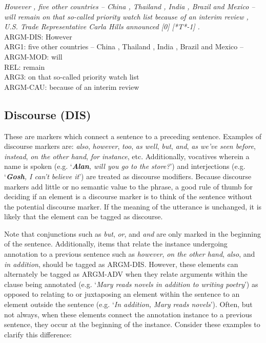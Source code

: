 \documentclass[11pt]{report}
\begin{document}
\textit{However , five other countries -- China , Thailand , India , Brazil and Mexico -- will remain on that so-called priority watch list because of an interim review , U.S. Trade Representative Carla Hills announced [0] [*T*-1] .}\\
ARGM-DIS:        However \\
ARG1:        five other countries -- China , Thailand , India , Brazil and Mexico -- \\
ARGM-MOD:        will \\
REL:        remain \\
ARG3:        on that so-called priority watch list \\
ARGM-CAU:        because of an interim review 

\subsection{Discourse (DIS)}
\label{ssec: DIS}

These are markers which connect a sentence to a preceding sentence. 
Examples of discourse markers are: \textit{also}, \textit{however}, \textit{too}, \textit{as well}, \textit{but}, \textit{and}, \textit{as we've seen before}, \textit{instead}, \textit{on the other hand}, \textit{for instance}, etc.  Additionally, vocatives wherein a name is spoken (e.g. `\textit{\textbf{Alan}, will you go to the store?}') and interjections (e.g. `\textit{\textbf{Gosh}, I can't believe it}') are treated as discourse modifiers.  Because discourse markers add little or no semantic value to the phrase, a good rule of thumb for deciding if an element is a discourse marker is to think of the sentence without the potential discourse marker.  If the meaning of the utterance is unchanged, it is likely that the element can be tagged as discourse.  

Note that conjunctions such as \textit{but}, \textit{or}, and \textit{and} are only marked in the beginning of the sentence.  Additionally, items that relate the instance undergoing annotation to a previous sentence such as \textit{however}, \textit{on the other hand}, \textit{also}, and \textit{in addition}, should be tagged as ARGM-DIS.  However, these elements can alternately be tagged as ARGM-ADV when they relate arguments within the clause being annotated (e.g. `\textit{Mary reads novels in addition to writing poetry}') as opposed to relating to or juxtaposing an element within the sentence to an element outside the sentence (e.g. `\textit{In addition, Mary reads novels}').  Often, but not always, when these elements connect the annotation instance to a previous sentence, they occur at the beginning of the instance.  Consider these examples to clarify this difference:
\end{document}
